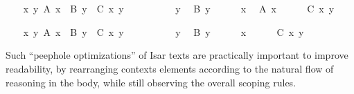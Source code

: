 \begin{isabellebody}
\begin{minipage}{0.5\textwidth}
\endisatagproof
{\isafoldproof}%
%
\isadelimproof
%
\endisadelimproof
%
\isadelimnoproof
\ %
\endisadelimnoproof
%
\isatagnoproof
{}\isamarkupfalse%
%
\endisatagnoproof
{\isafoldnoproof}%
%
\isadelimnoproof
\isanewline
%
\endisadelimnoproof
%
\isadelimproof
\ \ %
\endisadelimproof
%
\isatagproof
{}\isamarkupfalse%
%
\end{minipage}\\[3ex]\begin{minipage}{0.5\textwidth}
\ \ \isamarkupfalse%
\ {\isachardoublequoteopen}{\isasymAnd}x\ y{\isachardot}\ A\ x\ {\isasymLongrightarrow}\ B\ y\ {\isasymLongrightarrow}\ C\ x\ y{\isachardoublequoteclose}\isanewline
\ \ \isamarkupfalse%
\ {\isacharminus}\isanewline
\ \ \ \ \isamarkupfalse%
\ y\ \isamarkupfalse%
\ {\isachardoublequoteopen}B\ y{\isachardoublequoteclose}\isanewline
\ \ \ \ \isamarkupfalse%
\ x\ \isamarkupfalse%
\ {\isachardoublequoteopen}A\ x{\isachardoublequoteclose}\isanewline
\ \ \ \ \isamarkupfalse%
\ {\isachardoublequoteopen}C\ x\ y{\isachardoublequoteclose}\ \isamarkupfalse%
\isanewline
\ \ \isamarkupfalse%
%
\end{minipage}\begin{minipage}{0.5\textwidth}
\ \ \isamarkupfalse%
\ {\isachardoublequoteopen}{\isasymAnd}x\ y{\isachardot}\ A\ x\ {\isasymLongrightarrow}\ B\ y\ {\isasymLongrightarrow}\ C\ x\ y{\isachardoublequoteclose}\isanewline
\ \ \isamarkupfalse%
\ {\isacharminus}\isanewline
\ \ \ \ \isamarkupfalse%
\ y\ \isamarkupfalse%
\ {\isachardoublequoteopen}B\ y{\isachardoublequoteclose}\isanewline
\ \ \ \ \isamarkupfalse%
\ x\isanewline
\ \ \ \ \isamarkupfalse%
\ {\isachardoublequoteopen}C\ x\ y{\isachardoublequoteclose}\ \isamarkupfalse%
\isanewline
\ \ \isamarkupfalse%
%
\endisatagproof
{\isafoldproof}%
%
\isadelimproof
%
\endisadelimproof
%
\end{minipage}
%
\begin{isamarkuptext}%
\medskip\noindent Such ``peephole optimizations'' of Isar texts are
  practically important to improve readability, by rearranging
  contexts elements according to the natural flow of reasoning in the
  body, while still observing the overall scoping rules.


\end{isamarkuptext}
\end{isabellebody}
